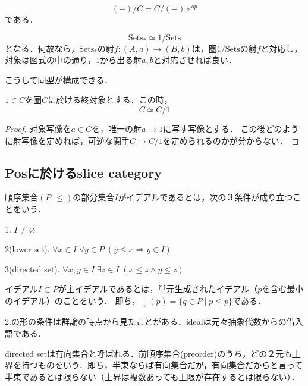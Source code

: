 \documentclass[uplatex, dvipdfmx]{jsarticle}
\begin{document}
\begin{proposition*}
    \[ (-)/C = C/(-)\circ {}^{op} \]
    である．
\end{proposition*}

\begin{example}
    \[\mathrm{Sets}_*\simeq 1/\mathrm{Sets}\]
    となる．何故なら，$\mathrm{Sets}_*$の射$f:(A,a)\to (B,b)$は，圏$1/\mathrm{Sets}$の射$f$と対応し，対象は図式の中の通り，$1$から出る射$a,b$と対応させれば良い．
    \begin{center}
    \end{center}
    こうして同型が構成できる．
\end{example}

\begin{proposition*}
    $1\in C$を圏$C$に於ける終対象とする．この時，
    \[ C\simeq C/1 \]
\end{proposition*}
\begin{proof}
    対象写像を$a\in C$を，唯一の射$a\to 1$に写す写像とする．
    この後どのように射写像を定めれば，可逆な関手$C\to C/1$を定められるのかが分からない．
\end{proof}

\subsection*{Posに於けるslice category}

\begin{definition*}
    順序集合$(P,\le)$の部分集合$I$がイデアルであるとは，次の３条件が成り立つことをいう．

    1. $I\ne\varnothing$

    2(lower set). $\forall x\in I\; \forall y\in P\; (y\le x\Rightarrow y\in I)$

    3(directed set). $\forall x,y\in I\; \exists z\in I\; (x\le z\land y\le z)$

    イデアル$I\subset P$が主イデアルであるとは，単元生成されたイデアル（$p$を含む最小のイデアル）のことをいう．
    即ち，$\downarrow(p)=\{q\in P\mid p\le p\}$である．
\end{definition*}
\begin{remark*}
    2.の形の条件は群論の時点から見たことがある．idealは元々抽象代数からの借入語である．

    directed setは有向集合と呼ばれる．前順序集合(preorder)のうち，どの２元も\underline{上界}を持つものをいう．即ち，半束ならば有向集合だが，有向集合だからと言って半束であるとは限らない（上界は複数あっても上限が存在するとは限らない）．
\end{remark*}
\end{document}
